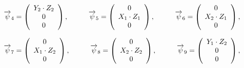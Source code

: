 \begin{equation*}
	\overrightarrow{\psi}_4 = \left(
	\begin{array}{c}
		Y_2 \cdot Z_2\\
		0\\
		0\\
	\end{array}
	\right),
	\hspace{10mm}
	\overrightarrow{\psi}_5 = \left(
	\begin{array}{c}
		0\\
		X_1 \cdot Z_1\\
		0\\
	\end{array}
	\right),
	\hspace{10mm}
	\overrightarrow{\psi}_6 = \left(
	\begin{array}{c}
		0\\
		X_2 \cdot Z_1\\
		0\\
	\end{array}
	\right),
\end{equation*}


\begin{equation*}
	\overrightarrow{\psi}_7 = \left(
	\begin{array}{c}
		0\\
		X_1 \cdot Z_2\\
		0\\
	\end{array}
	\right),
	\hspace{10mm}
	\overrightarrow{\psi}_8 = \left(
	\begin{array}{c}
		0\\
		X_2 \cdot Z_2\\
		0\\
	\end{array}
	\right),
	\hspace{10mm}
	\overrightarrow{\psi}_9 = \left(
	\begin{array}{c}
		Y_1 \cdot Z_2\\
		0\\
		0\\
	\end{array}
	\right),
\end{equation*}

